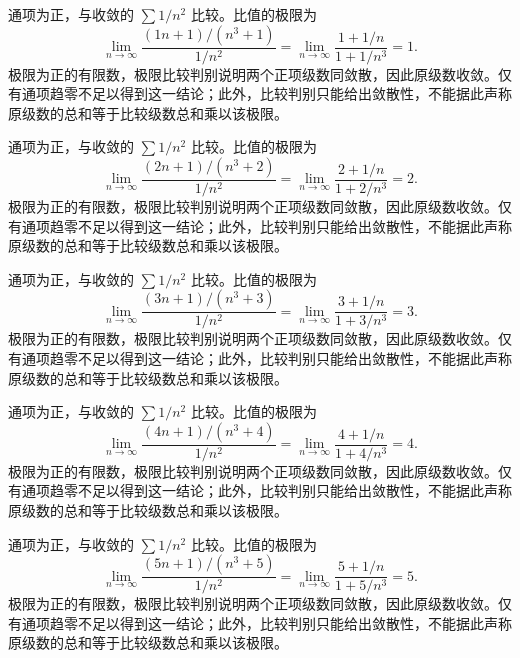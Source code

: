 \documentclass[UTF8,12pt,a4paper,fontset=fandol]{ctexart}
\begin{document}
\begin{solve}\label{ans:c24q19}
通项为正，与收敛的 $\sum1/n^2$ 比较。比值的极限为
\[
\lim_{n\to\infty}\frac{(1n+1)/(n^3+1)}{1/n^2}=\lim_{n\to\infty}\frac{1+1/n}{1+1/n^3}=1.
\]
极限为正的有限数，极限比较判别说明两个正项级数同敛散，因此原级数收敛。仅有通项趋零不足以得到这一结论；此外，比较判别只能给出敛散性，不能据此声称原级数的总和等于比较级数总和乘以该极限。
\end{solve}

\begin{solve}\label{ans:c24q20}
通项为正，与收敛的 $\sum1/n^2$ 比较。比值的极限为
\[
\lim_{n\to\infty}\frac{(2n+1)/(n^3+2)}{1/n^2}=\lim_{n\to\infty}\frac{2+1/n}{1+2/n^3}=2.
\]
极限为正的有限数，极限比较判别说明两个正项级数同敛散，因此原级数收敛。仅有通项趋零不足以得到这一结论；此外，比较判别只能给出敛散性，不能据此声称原级数的总和等于比较级数总和乘以该极限。
\end{solve}

\begin{solve}\label{ans:c24q21}
通项为正，与收敛的 $\sum1/n^2$ 比较。比值的极限为
\[
\lim_{n\to\infty}\frac{(3n+1)/(n^3+3)}{1/n^2}=\lim_{n\to\infty}\frac{3+1/n}{1+3/n^3}=3.
\]
极限为正的有限数，极限比较判别说明两个正项级数同敛散，因此原级数收敛。仅有通项趋零不足以得到这一结论；此外，比较判别只能给出敛散性，不能据此声称原级数的总和等于比较级数总和乘以该极限。
\end{solve}

\begin{solve}\label{ans:c24q22}
通项为正，与收敛的 $\sum1/n^2$ 比较。比值的极限为
\[
\lim_{n\to\infty}\frac{(4n+1)/(n^3+4)}{1/n^2}=\lim_{n\to\infty}\frac{4+1/n}{1+4/n^3}=4.
\]
极限为正的有限数，极限比较判别说明两个正项级数同敛散，因此原级数收敛。仅有通项趋零不足以得到这一结论；此外，比较判别只能给出敛散性，不能据此声称原级数的总和等于比较级数总和乘以该极限。
\end{solve}

\begin{solve}\label{ans:c24q23}
通项为正，与收敛的 $\sum1/n^2$ 比较。比值的极限为
\[
\lim_{n\to\infty}\frac{(5n+1)/(n^3+5)}{1/n^2}=\lim_{n\to\infty}\frac{5+1/n}{1+5/n^3}=5.
\]
极限为正的有限数，极限比较判别说明两个正项级数同敛散，因此原级数收敛。仅有通项趋零不足以得到这一结论；此外，比较判别只能给出敛散性，不能据此声称原级数的总和等于比较级数总和乘以该极限。
\end{solve}
\end{document}
